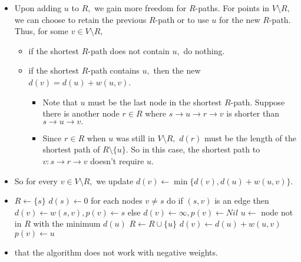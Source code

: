 \documentclass[a4paper,12pt]{article}
\begin{document}
\begin{itemize}
    \item Upon adding $u$ to $R,$ we gain more freedom for $R$-paths. For points in $V\setminus R,$ we can choose to retain the previous $R$-path or to use $u$ for the new $R$-path. Thus, for some $v\in V\setminus R,$
    \begin{itemize}
        \item if the shortest $R$-path does not contain $u,$ do nothing.
        \item if the shortest $R$-path contains $u,$ then the new $d(v)=d(u)+w(u,v)$. \begin{itemize}
            \item Note that $u$ must be the last node in the shortest $R$-path. Suppose there is another node $r\in R$ where $s\to u\to r\to v$ is shorter than $s\to u\to v.$
            \item Since $r\in R$ when $u$ was still in $V\setminus R,$ $d(r)$ must be the length of the shortest path of $R\setminus\{u\}.$ So in this case, the shortest path to $v:s\to r\to v$ doesn't require $u.$
        \end{itemize}
    \end{itemize}
    \item So for every $v\in V\setminus R,$ we update $d(v)\gets\min\{d(v),d(u)+w(u,v)\}.$
    \item \begin{algorithmic}[1]
        \State $R\gets\{s\}$
        \State $d(s)\gets 0$
        for each nodes $v\neq s$ do if $(s,v)$ is an edge then $d(v)\gets w(s,v), p(v)\gets s$ else $d(v)\gets\infty,p(v)\gets Nil$
            \State $u\gets$ node not in $R$ with the minimum $d(u)$
            \State $R\gets R\cup\{u\}$
                    \State $d(v)\gets d(u)+w(u,v)$
                    \State $p(v)\gets u$
                \EndIf
            \EndForeach
        \EndWhile
        \EndProcedure
        \end{algorithmic}
    \item {} that the algorithm does not work with negative weights.
\end{itemize}
\end{document}
